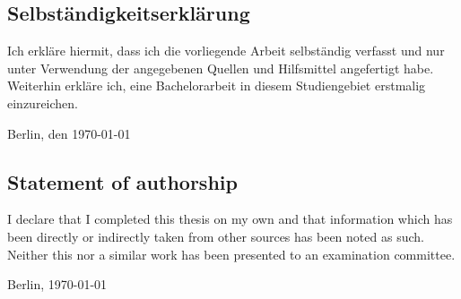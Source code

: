 \thispagestyle{empty}
 
 
{\parindent 0cm
   
  \subsection*{Selbst\"andigkeitserkl\"arung}
  Ich erkl\"are hiermit, dass ich die vorliegende Arbeit selbst\"andig verfasst 
  und nur unter Verwendung der angegebenen Quellen und Hilfsmittel angefertigt habe. 
  Weiterhin erkl\"are ich, eine Bachelorarbeit in diesem Studiengebiet erstmalig einzureichen.\\
  \vspace{3\baselineskip}
   
  Berlin, den \today \hspace{0.25\linewidth}\parbox{0.3\linewidth}{\dotfill}
 
\subsection*{Statement of authorship}
I declare that I completed this thesis on my own and that information which has been 
directly or indirectly taken from other sources has been noted as such. Neither this 
nor a similar work has been presented to an examination committee.
 
  \vspace{3\baselineskip}
   
  Berlin, \today \hspace{0.25\linewidth}\parbox{0.3\linewidth}{\dotfill}
}
